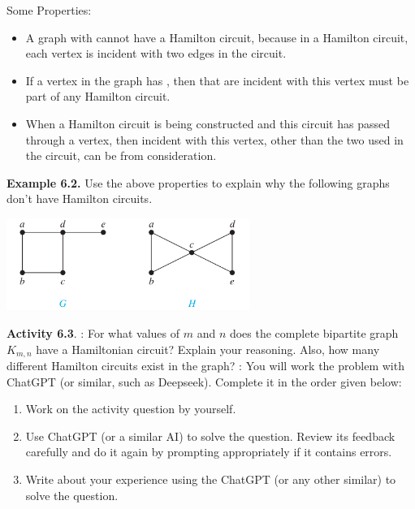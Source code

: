 \documentclass[aspectratio=169]{beamer}
\begin{document}
\begin{frame}[plain]{}

Some Properties:
\begin{itemize}
  \item A graph with  cannot have a Hamilton circuit, 
   because in a Hamilton circuit, each vertex is incident with two edges in the circuit.\pause
  \item  If a vertex in the graph has , then
       that are incident with this vertex must be part of 
      any Hamilton circuit. \pause
  \item When a Hamilton circuit is being constructed and this circuit has passed through 
  a vertex, then  incident with this vertex, other than the two used 
  in the circuit, can be  from consideration. \pause
\end{itemize}

{\bf Example 6.2.} 
Use the above properties to explain why the following graphs don't have Hamilton circuits.

  \begin{center}
        \includegraphics[height=3cm]{./img/lecture6-fig3.png}
 \end{center}

\end{frame}

\begin{frame}[plain]{}

 {\bf Activity 6.3}. 
 :  For what values of $m$ and $n$ does the complete bipartite graph $K_{m,n}$
 have a Hamiltonian circuit? Explain your reasoning.
 Also,  how many different Hamilton circuits exist in the graph?
 \smallskip
 : You will work the problem with ChatGPT (or similar, such as Deepseek). 
  Complete it in the order given below:
  \begin{enumerate}
    \item Work on the activity question by yourself.
    \item Use ChatGPT (or a similar AI) to solve the question. Review its feedback carefully and do it again by prompting appropriately if it contains errors.
    \item Write about your experience using the ChatGPT (or any other similar) to solve the question.
   \end{enumerate}

  \vspace{1in}

\end{frame}


 
\end{document}
